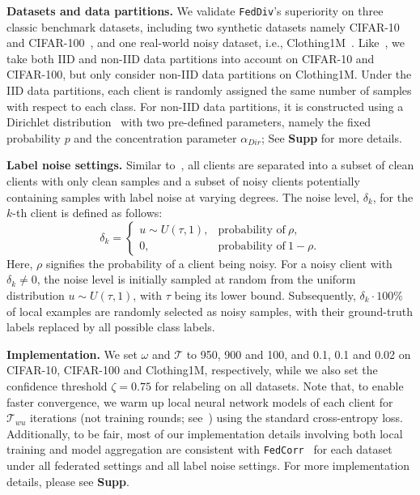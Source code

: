 \documentclass[letterpaper]{article} %
\begin{document}
\noindent
\textbf{Datasets and data partitions.} 
We validate \texttt{FedDiv}'s superiority on three classic benchmark datasets, including two synthetic datasets namely CIFAR-10~\cite{cifar} and CIFAR-100~\cite{cifar}, and one real-world noisy dataset, i.e., Clothing1M~\cite{clothing1m}.
Like~\cite{xu2022fedcorr}, we take both IID and non-IID data partitions into account on CIFAR-10 and CIFAR-100, but only consider non-IID data partitions on Clothing1M. Under the IID data partitions, each client is randomly assigned the same number of samples with respect to each class. For non-IID data partitions, it is constructed using a Dirichlet distribution~\cite{lin2020ensemble} with two pre-defined parameters, namely the fixed probability $p$ and the concentration parameter $\alpha_{Dir}$; See \textbf{Supp} for more details.

\noindent
\textbf{Label noise settings.}
Similar to~\cite{xu2022fedcorr}, all clients are separated into a subset of clean clients with only clean samples and a subset of noisy clients potentially containing samples with label noise at varying degrees. The noise level, ${\delta}_{k}$, for the $k$-th client is defined as follows:
\begin{equation}
    \label{Equation:Noise}
    {\delta}_{k} =
    \begin{cases} 
        u \sim U(\tau, 1),  & \text{probability of}~\rho, \\
        0, &  \text{probability of}~1-\rho.
    \end{cases}
\end{equation}
Here, $\rho$ signifies the probability of a client being noisy. For a noisy client with ${\delta}_{k}\ne0$, the noise level is initially sampled at random from the uniform distribution $u \sim U(\tau, 1)$, with $\tau$ being its lower bound. Subsequently, ${\delta}_{k} \cdot 100\%$ of local examples are randomly selected as noisy samples, with their ground-truth labels replaced by all possible class labels.

\noindent
\textbf{Implementation.}
We set $\omega$ and $\mathcal{T}$ to 950, 900 and 100, and 0.1, 0.1 and 0.02 on CIFAR-10, CIFAR-100 and Clothing1M, respectively, while we also set the confidence threshold $\zeta=0.75$ for relabeling on all datasets. Note that, to enable faster convergence, we warm up local neural network models of each client for $\mathcal{T}_{wu}$ iterations (not training rounds; see~\cite{xu2022fedcorr}) using the standard cross-entropy loss. Additionally, to be fair, most of our implementation details involving both local training and model aggregation are consistent with \texttt{FedCorr}~\cite{xu2022fedcorr} for each dataset under all federated settings and all label noise settings. For more implementation details, please see \textbf{Supp}.
\end{document}
